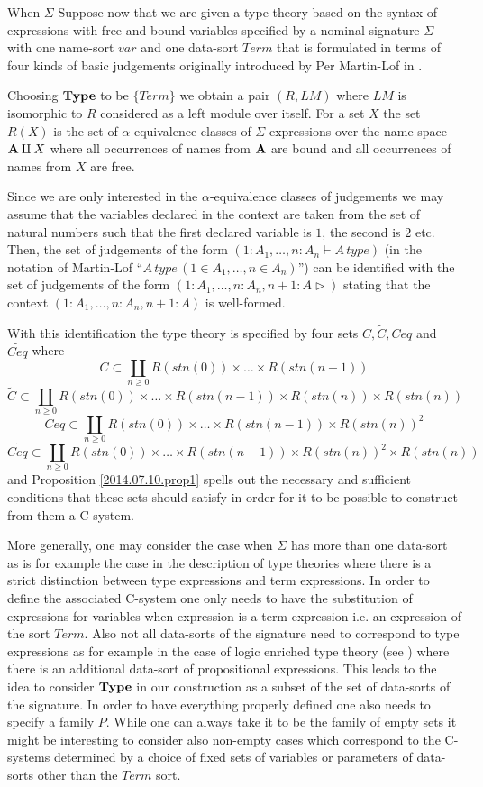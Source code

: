 \documentclass[11pt]{article}
\newcommand{\wt}{\widetilde}
\begin{document}
{{When $\Sigma$ Suppose now that we are given a type theory based on the syntax of expressions with free and bound variables specified by a nominal signature $\Sigma$ with one name-sort $var$ and one data-sort $Term$ that is formulated in terms of four kinds of basic judgements originally introduced by Per Martin-Lof in \cite[p.161]{MLTT79}.  

Choosing $\bf Type$ to be $\{Term\}$ we obtain a pair $(R,LM)$ where $LM$ is isomorphic to $R$ considered as a left module over itself. For a set $X$ the set $R(X)$ is the set of $\alpha$-equivalence classes of $\Sigma$-expressions over the name space ${\bf A}\amalg X$ where all occurrences of names from $\bf A$ are bound and all occurrences of names from $X$ are free.  

Since we are only interested in the $\alpha$-equivalence classes of judgements we may assume that the variables declared in the context are taken from the set of natural numbers such that the first declared variable is $1$, the second is $2$ etc.  Then, the set of judgements of the form $(1:A_1,\dots,n:A_n\vdash A\, type)$ (in the notation of Martin-Lof ``$A\,type\,(1\in A_1,\dots,n\in A_n)$'') can be identified with the set of judgements of the form $(1:A_1,\dots,n:A_n, n+1:A\rhd)$ stating that the context $(1:A_1,\dots,n:A_n, n+1:A)$ is well-formed. 

With this identification the type theory is specified by four sets $C,\wt{C},Ceq$ and $\wt{Ceq}$ where 
%
$$C \subset \coprod_{n\ge 0} R({stn(0)})\times\dots\times R({stn(n-1)})$$
$$\wt{C}\subset  \coprod_{n\ge 0} R({stn(0)})\times\dots\times R({stn(n-1)})\times R({stn(n)})\times R({stn(n)})$$
$$Ceq \subset \coprod_{n\ge 0} R({stn(0)})\times\dots\times R({stn(n-1)})\times R({stn(n)})^2$$
$$\wt{Ceq} \subset \coprod_{n\ge 0} R({stn(0)})\times\dots\times R({stn(n-1)})\times R({stn(n)})^2\times R({stn(n)})$$ 
%
and Proposition \ref{2014.07.10.prop1} spells out the necessary and sufficient conditions that these sets should satisfy in order for it to be possible to construct from them a C-system. 





More generally, one may consider the case when $\Sigma$ has more than one data-sort as is for example the case in the description of type theories where there is a strict distinction between type expressions and term expressions. In order to define the associated C-system one only needs to have the substitution of expressions for variables when expression is a term expression i.e. an expression of the sort $Term$. Also not all data-sorts of the signature need to correspond to type expressions as for example in the case of logic enriched type theory (see \cite{AczelGambino}) where there is an additional data-sort of propositional expressions. This leads to the idea to consider $\bf Type$ in our construction as a subset of the set of data-sorts of the signature. In order to have everything properly defined one also needs to specify a family $P$. While one can always take it to be the family of empty sets it might be interesting to consider also non-empty cases which correspond to the C-systems determined by a choice of fixed sets of variables or parameters of data-sorts other than the $Term$ sort. 

}}
\end{document}
